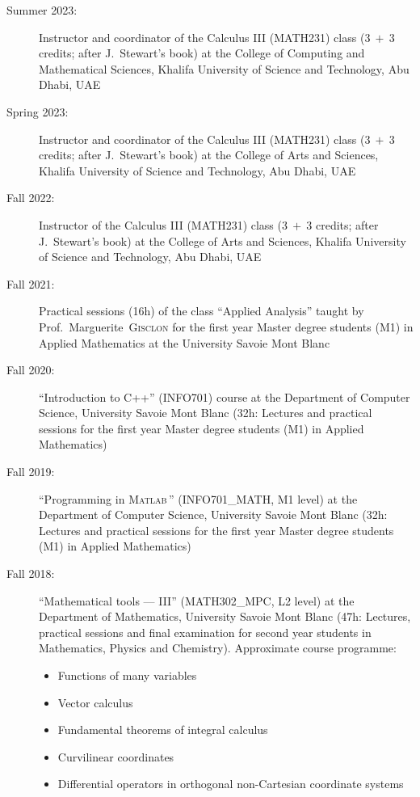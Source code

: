 \documentclass[final, a4paper, oneside, 12pt]{article}
\numberwithin{equation}{section}
\begin{document}
\begin{description}
  \item[Summer 2023:] Instructor and coordinator of the Calculus III (MATH231) class ($3\ +\ 3$ credits; after J.~Stewart's book) at the College of Computing and Mathematical Sciences, Khalifa University of Science and Technology, Abu Dhabi, UAE

  \item[Spring 2023:] Instructor and coordinator of the Calculus III (MATH231) class ($3\ +\ 3$ credits; after J.~Stewart's book) at the College of Arts and Sciences, Khalifa University of Science and Technology, Abu Dhabi, UAE

  \item[Fall 2022:] Instructor of the Calculus III (MATH231) class ($3\ +\ 3$ credits; after J.~Stewart's book) at the College of Arts and Sciences, Khalifa University of Science and Technology, Abu Dhabi, UAE

  \item[Fall 2021:] Practical sessions (16h) of the class ``Applied Analysis'' taught by Prof.~Marguerite~\textsc{Gisclon} for the first year Master degree students (M1) in Applied Mathematics at the University Savoie Mont Blanc

  \item[Fall 2020:] ``Introduction to C++'' (INFO701) course at the Department of Computer Science, University Savoie Mont Blanc (32h: Lectures and practical sessions for the first year Master degree students (M1) in Applied Mathematics)

  \item[Fall 2019:] ``Programming in \textsc{Matlab}\texttrademark\,'' (INFO701\_MATH, M1 level) at the Department of Computer Science, University Savoie Mont Blanc (32h: Lectures and practical sessions for the first year Master degree students (M1) in Applied Mathematics)

  \item[Fall 2018:] ``Mathematical tools --- III'' (MATH302\_MPC, L2 level) at the Department of Mathematics, University Savoie Mont Blanc (47h: Lectures, practical sessions and final examination for second year students in Mathematics, Physics and Chemistry). Approximate course programme:
  \begin{itemize}
    \item Functions of many variables
    \item Vector calculus
    \item Fundamental theorems of integral calculus
    \item Curvilinear coordinates
    \item Differential operators in orthogonal non-Cartesian coordinate systems
  \end{itemize}


\end{description}
\end{document}
